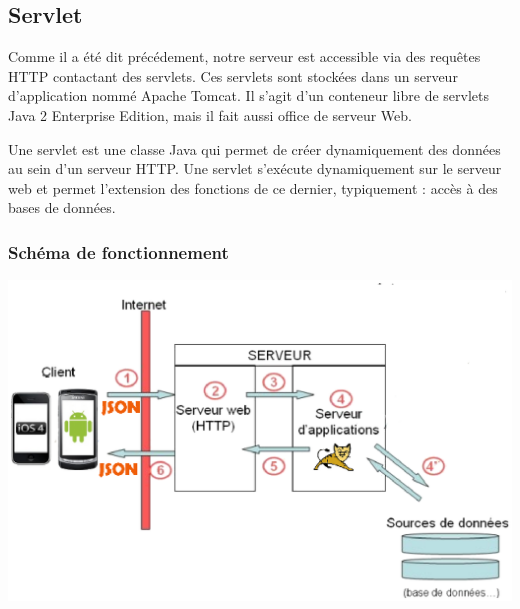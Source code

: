 \documentclass[a4paper,11pt]{report}
\begin{document}
		\subsection{Servlet}
		Comme il a été dit précédement, notre serveur est accessible via des requêtes
		HTTP contactant des servlets. Ces servlets sont stockées dans un serveur
		d'application nommé Apache Tomcat. Il s'agit d'un conteneur libre de
		servlets Java 2 Enterprise Edition, mais il fait aussi office de serveur
		Web.
		
		Une servlet est une classe Java qui permet de créer dynamiquement des données
		au sein d'un serveur HTTP. Une servlet s'exécute dynamiquement sur le serveur
		web et permet l'extension des fonctions de ce dernier, typiquement : accès à
		des bases de données.
		
		\subsubsection{Schéma de fonctionnement }
		
		\begin{center}
			\includegraphics[width=16cm]{./diagrammes/serveurappli.eps}
		\end{center}
		
\end{document}
